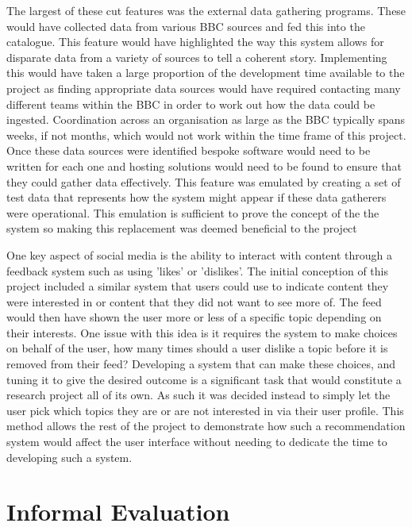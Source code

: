 \documentclass[12pt,titlepage]{article}
\begin{document}
  The largest of these cut features was the external data gathering programs.
  These would have collected data from various BBC sources and fed this into the
  catalogue. This feature would have highlighted the way this system allows for
  disparate data from a variety of sources to tell a coherent story.
  Implementing this would have taken a large proportion of the development time
  available to the project as finding appropriate data sources would have
  required contacting many different teams within the BBC in order to work out
  how the data could be ingested. Coordination across an organisation as large
  as the BBC typically spans weeks, if not months, which would not work within
  the time frame of this project. Once these data sources were identified
  bespoke software would need to be written for each one and hosting solutions
  would need to be found to ensure that they could gather data effectively. This
  feature was emulated by creating a set of test data that represents how the
  system might appear if these data gatherers were operational. This emulation
  is sufficient to prove the concept of the the system so making this
  replacement was deemed beneficial to the project

  One key aspect of social media is the ability to interact with content through
  a feedback system such as using 'likes' or 'dislikes'. The initial conception
  of this project included a similar system that users could use to indicate
  content they were interested in or content that they did not want to see more
  of. The feed would then have shown the user more or less of a specific topic
  depending on their interests. One issue with this idea is it requires the
  system to make choices on behalf of the user, how many times should a user
  dislike a topic before it is removed from their feed? Developing a system that
  can make these choices, and tuning it to give the desired outcome is a
  significant task that would constitute a research project all of its own. As
  such it was decided instead to simply let the user pick which topics they are
  or are not interested in via their user profile. This method allows the rest
  of the project to demonstrate how such a recommendation system would affect
  the user interface without needing to dedicate the time to developing such a
  system.



\section{Informal Evaluation}
\end{document}
